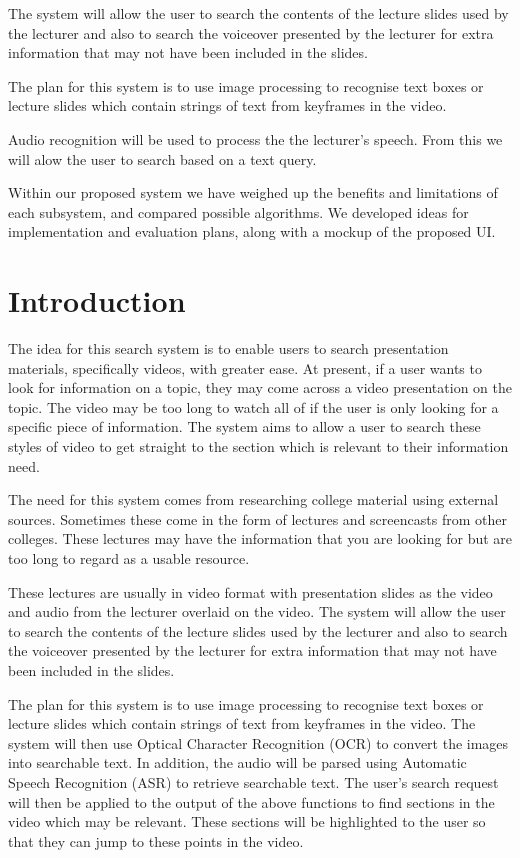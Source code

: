 \documentclass[a4paper,12pt]{article}
\begin{document}
The system will allow the user to search the contents of the lecture slides used by the lecturer and also to search the voiceover presented by the lecturer for extra information that may not have been included in the slides.

The plan for this system is to use image processing to recognise text boxes or lecture slides which contain strings of text from keyframes in the video.

Audio recognition will be used to process the the lecturer's speech. From this we will alow the user to search based on a text query.

Within our proposed system we have weighed up the benefits and limitations of each subsystem, and compared possible algorithms. We developed ideas for implementation and evaluation plans, along with a mockup of the proposed UI.

\section{Introduction}
The idea for this search system is to enable users to search presentation materials, specifically videos, with greater ease. At present, if a user wants to look for information on a topic, they may come across a video presentation on the topic. The video may be too long to watch all of if the user is only looking for a specific piece of information. The system aims to allow a user to search these styles of video to get straight to the section which is relevant to their information need.

The need for this system comes from researching college material using external sources. Sometimes these come in the form of lectures and screencasts from other colleges. These lectures may have the information that you are looking for but are too long to regard as a usable resource.

These lectures are usually in video format with presentation slides as the video and audio from the lecturer overlaid on the video. The system will allow the user to search the contents of the lecture slides used by the lecturer and also to search the voiceover presented by the lecturer for extra information that may not have been included in the slides.

The plan for this system is to use image processing to recognise text boxes or lecture slides which contain strings of text from keyframes in the video. The system will then use Optical Character Recognition (OCR) to convert the images into searchable text. In addition, the audio will be parsed using Automatic Speech Recognition (ASR) to retrieve searchable text. The user’s search request will then be applied to the output of the above functions to find sections in the video which may be relevant. These sections will be highlighted to the user so that they can jump to these points in the video.
\end{document}
